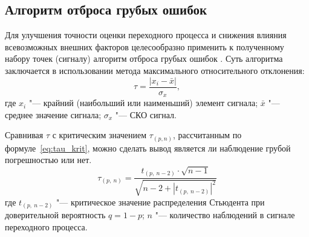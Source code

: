 \subsection{Алгоритм отброса грубых ошибок}

Для улучшения точности оценки переходного процесса и снижения влияния всевозможных внешних факторов целесообразно применить к полученному набору точек (сигналу) алгоритм отброса грубых ошибок \cite{LvovStat}.
Суть алгоритма заключается в использовании метода максимального относительного отклонения:
\begin{equation}\label{eq:MOO}
	\tau=\frac{|x_i-\bar{x}|}{\sigma_x},
\end{equation} 
где $ x_i $ "--- крайний (наибольший или наименьший) элемент сигнала; $ \bar{x} $ "--- среднее значение сигнала; $ \sigma_x $ "--- СКО сигнал.

Сравнивая $ \tau $ с критическим значением $ \tau_{(p,n)} $, рассчитанным по формуле~\ref{eq:tau_krit}, можно сделать вывод является ли наблюдение грубой погрешностью или нет.
\begin{equation}\label{eq:tau_krit}
	\tau_{(p,\ n)}=\frac{t_{(p,\ n-2)}\cdot\sqrt{n-1}}{\sqrt{n-2+|t_{(p,\ n-2)}|^2}}
\end{equation}
где $ t_{(p,\ n-2)} $ "--- критическое значение распределения Стьюдента при доверительной вероятность $ q=1-p $; $ n $ "--- количество наблюдений в сигнале переходного процесса.


